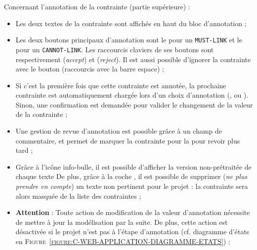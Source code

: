 		Concernant l'annotation de la contrainte (partie supérieure) :
		\begin{itemize}
			\item Les deux textes de la contrainte sont affichés en haut du bloc d'annotation ;
			\item Les deux boutons principaux d'annotation sont le \textguillemets{\textcolor{colorApplicationMUSTLINK}{\faEquals}} pour un \texttt{MUST-LINK} et le \textguillemets{\textcolor{colorApplicationCANNOTLINK}{\faNotEqual}} pour un \texttt{CANNOT-LINK}.
			Les raccourcis claviers de ses boutons sont respectivement  (\textit{accept}) et  (\textit{reject}).
			Il est aussi possible d'ignorer la contrainte avec le bouton \textguillemets{\textcolor{colorApplicationSKIP}{\faQuestion}} (raccourcis avec la barre espace) ;
			\item Si c'est la première fois que cette contrainte est annotée, la prochaine contrainte est automatiquement chargée lors d'un choix d'annotation (\textguillemets{\textcolor{colorApplicationMUSTLINK}{\faEquals}}, \textguillemets{\textcolor{colorApplicationCANNOTLINK}{\faNotEqual}} ou \textguillemets{\textcolor{colorApplicationSKIP}{\faQuestion}}).
			Sinon, une confirmation est demandée pour valider le changement de la valeur de la contrainte ;
			\item Une gestion de revue d'annotation est possible grâce à un champ de commentaire, et \textguillemets{\textcolor{colorApplicationREVIEW}{\faCheckSquare}} permet de marquer la contrainte pour la pour revoir plus tard ;
			\item Grâce à l'icône info-bulle, il est possible d'afficher la version non-prétraitée de chaque texte
			De plus, grâce à la coche \textguillemets{\textcolor{colorApplicationDELETE}{\faTrash}}, il est possible de supprimer (\textit{ne plus prendre en compte}) un texte non pertinent pour le projet : la contrainte sera alors masquée de la liste des contraintes ;
			\item \textbf{Attention} : Toute action de modification de la valeur d'annotation nécessite de mettre à jour la modélisation par la suite.
			De plus, cette action est désactivée si le projet n'est pas à l'étape d'annotation (cf. diagramme d'états en \textsc{Figure~\ref{figure:C-WEB-APPLICATION-DIAGRAMME-ETATS}}) ;
		\end{itemize}
		
